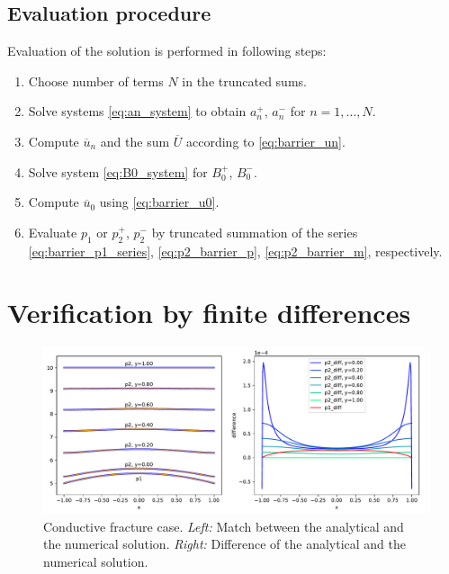 \documentclass{elsarticle}
\def\ol#1{\overline{#1}}
\begin{document}
\subsection{Evaluation procedure}

Evaluation of the solution is performed in following steps:
\begin{enumerate}
    \item Choose number of terms $N$ in the truncated sums.
    \item Solve systems \eqref{eq:an_system} to obtain $a_n^+$, $a_n^-$ for $n=1,\dots, N$.
    \item Compute $\ol{u}_n$ and the sum $\ol{U}$ according to \eqref{eq:barrier_un}.
    \item Solve system \eqref{eq:B0_system} for $B_0^+$, $B_0^-$.
    \item Compute $\ol{u}_0$ using \eqref{eq:barrier_u0}.
    \item Evaluate $p_1$ or $p_2^+$, $p_2^-$ by truncated summation of the series \eqref{eq:barrier_p1_series},
          \eqref{eq:p2_barrier_p}, \eqref{eq:p2_barrier_m}, respectively.
\end{enumerate}





\section{Verification by finite differences}
\label{sec:verify}

\begin{figure}
  \label{fig:cont_solution}
  \centering
  \includegraphics[width=\textwidth]{./continuous_solution.pdf}
  \caption{Conductive fracture case. 
  {\it Left:} Match between the analytical and the numerical solution. 
  {\it Right:} Difference of the analytical and the numerical solution.}
\end{figure}
\end{document}
